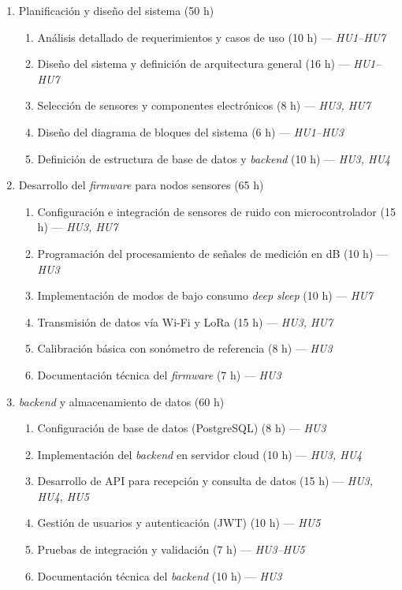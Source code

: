 \documentclass[
11pt, %
]{charter}
\begin{document}
\begin{enumerate}
    \item Planificación y diseño del sistema (50 h)
    \begin{enumerate}
        \item Análisis detallado de requerimientos y casos de uso (10 h) — \textit{HU1–HU7}
        \item Diseño del sistema y definición de arquitectura general (16 h) — \textit{HU1–HU7}
        \item Selección de sensores y componentes electrónicos (8 h) — \textit{HU3, HU7}
        \item Diseño del diagrama de bloques del sistema (6 h) — \textit{HU1–HU3}
        \item Definición de estructura de base de datos y \textit{backend} (10 h) — \textit{HU3, HU4}
    \end{enumerate}

    \item Desarrollo del \textit{firmware} para nodos sensores (65 h)
    \begin{enumerate}
        \item Configuración e integración de sensores de ruido con microcontrolador (15 h) — \textit{HU3, HU7}
        \item Programación del procesamiento de señales de medición en dB (10 h) — \textit{HU3}
        \item Implementación de modos de bajo consumo  \textit{deep sleep} (10 h) — \textit{HU7}
        \item Transmisión de datos vía Wi-Fi y LoRa (15 h) — \textit{HU3, HU7}
        \item Calibración básica con sonómetro de referencia (8 h) — \textit{HU3}
        \item Documentación técnica del \textit{firmware} (7 h) — \textit{HU3}
    \end{enumerate}

    \item \textit{backend} y almacenamiento de datos (60 h)
    \begin{enumerate}
        \item Configuración de base de datos (PostgreSQL) (8 h) — \textit{HU3}
        \item Implementación del \textit{backend} en servidor cloud (10 h) — \textit{HU3, HU4}
        \item Desarrollo de API para recepción y consulta de datos (15 h) — \textit{HU3, HU4, HU5}
        \item Gestión de usuarios y autenticación (JWT) (10 h) — \textit{HU5}
        \item Pruebas de integración y validación (7 h) — \textit{HU3–HU5}
        \item Documentación técnica del \textit{backend} (10 h) — \textit{HU3}
    \end{enumerate}


\end{enumerate}
\end{document}
